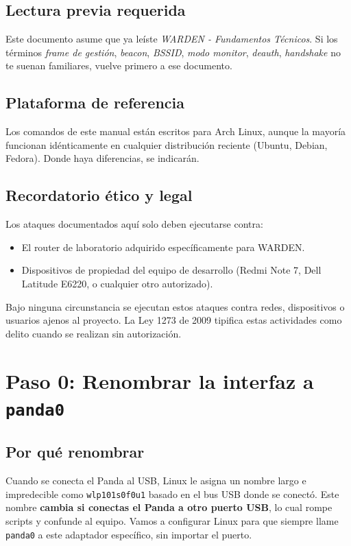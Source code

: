 \documentclass[11pt,a4paper]{article}
\begin{document}
\subsection{Lectura previa requerida}
Este documento asume que ya leíste \emph{WARDEN - Fundamentos Técnicos}.
Si los términos \emph{frame de gestión}, \emph{beacon}, \emph{BSSID},
\emph{modo monitor}, \emph{deauth}, \emph{handshake} no te suenan
familiares, vuelve primero a ese documento.

\subsection{Plataforma de referencia}
Los comandos de este manual están escritos para Arch Linux, aunque la
mayoría funcionan idénticamente en cualquier distribución reciente
(Ubuntu, Debian, Fedora). Donde haya diferencias, se indicarán.

\subsection{Recordatorio ético y legal}
Los ataques documentados aquí solo deben ejecutarse contra:

\begin{itemize}
  \item El router de laboratorio adquirido específicamente para WARDEN.
  \item Dispositivos de propiedad del equipo de desarrollo (Redmi Note 7,
    Dell Latitude E6220, o cualquier otro autorizado).
\end{itemize}

Bajo ninguna circunstancia se ejecutan estos ataques contra redes,
dispositivos o usuarios ajenos al proyecto. La Ley 1273 de 2009 tipifica
estas actividades como delito cuando se realizan sin autorización.

\section{Paso 0: Renombrar la interfaz a \texttt{panda0}}

\subsection{Por qué renombrar}
Cuando se conecta el Panda al USB, Linux le asigna un nombre largo e
impredecible como \texttt{wlp101s0f0u1} basado en el bus USB donde se
conectó. Este nombre \textbf{cambia si conectas el Panda a otro puerto
USB}, lo cual rompe scripts y confunde al equipo. Vamos a configurar
Linux para que siempre llame \texttt{panda0} a este adaptador específico,
sin importar el puerto.
\end{document}
